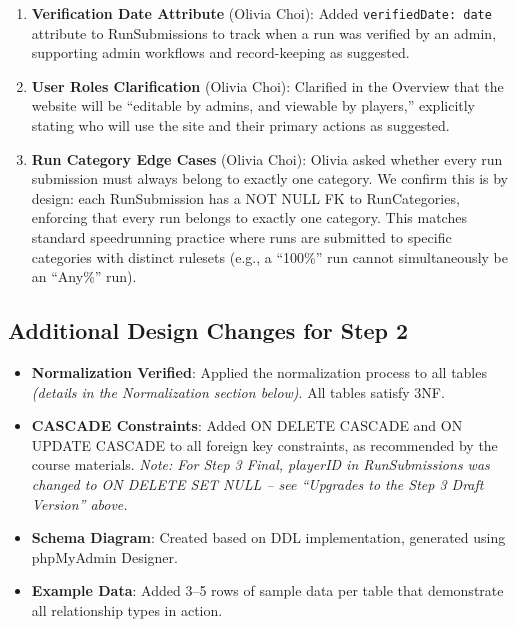 \documentclass[11pt]{article}
\begin{document}
\begin{enumerate}[leftmargin=2em]
    \item \textbf{Verification Date Attribute} (Olivia Choi): Added \texttt{verifiedDate: date} attribute to RunSubmissions to track when a run was verified by an admin, supporting admin workflows and record-keeping as suggested.

    \item \textbf{User Roles Clarification} (Olivia Choi): Clarified in the Overview that the website will be ``editable by admins, and viewable by players,'' explicitly stating who will use the site and their primary actions as suggested.

    \item \textbf{Run Category Edge Cases} (Olivia Choi): Olivia asked whether every run submission must always belong to exactly one category. We confirm this is by design: each RunSubmission has a NOT NULL FK to RunCategories, enforcing that every run belongs to exactly one category. This matches standard speedrunning practice where runs are submitted to specific categories with distinct rulesets (e.g., a ``100\%'' run cannot simultaneously be an ``Any\%'' run).
\end{enumerate}

\subsection*{Additional Design Changes for Step 2}

\begin{itemize}[leftmargin=2em]
    \item \textbf{Normalization Verified}: Applied the normalization process to all tables \textit{(details in the Normalization section below)}. All tables satisfy 3NF.
    \item \textbf{CASCADE Constraints}: Added ON DELETE CASCADE and ON UPDATE CASCADE to all foreign key constraints, as recommended by the course materials. \textit{Note: For Step 3 Final, playerID in RunSubmissions was changed to ON DELETE SET NULL -- see ``Upgrades to the Step 3 Draft Version'' above.}
    \item \textbf{Schema Diagram}: Created based on DDL implementation, generated using phpMyAdmin Designer.
    \item \textbf{Example Data}: Added 3--5 rows of sample data per table that demonstrate all relationship types in action.
\end{itemize}

\hrulefill

\end{document}
